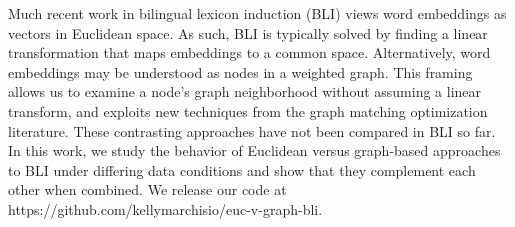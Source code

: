 Much recent work in bilingual lexicon induction (BLI) views word embeddings as vectors in Euclidean space.  As such, BLI is typically solved by finding a linear transformation that maps embeddings to a common space. Alternatively, word embeddings may be understood as nodes in a weighted graph.  This framing allows us to examine a node's graph neighborhood without assuming a linear transform, and exploits new techniques from the graph matching optimization literature. These contrasting approaches have not been compared in BLI so far. In this work, we study the behavior of Euclidean versus graph-based approaches to BLI under differing data conditions and show that they complement each other when combined. We release our code at https://github.com/kellymarchisio/euc-v-graph-bli.
